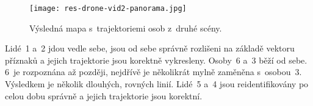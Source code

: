 \begin{figure}[H]
    \centering
    \texttt{[image: res-drone-vid2-panorama.jpg]}
    \caption[Výsledná mapa s~trajektoriemi osob z~druhé scény]{Výsledná mapa s~trajektoriemi osob z~druhé scény.}
\end{figure}

Lidé~1 a~2 jdou vedle sebe, jsou od sebe správně rozlišeni na základě vektoru příznaků a jejich trajektorie jsou korektně vykresleny. Osoby~6 a~3 běží od sebe. 6~je rozpoznána až později, nejdřívě je několikrát mylně zaměněna s~osobou~3. Výsledkem je několik dlouhých, rovných linií. Lidé~5 a~4 jsou reidentifikovány po celou dobu správně a jejich trajektorie jsou korektní.

